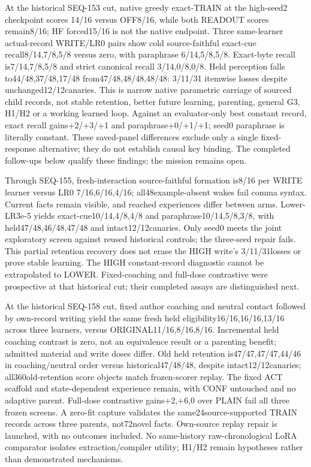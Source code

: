\documentclass{article}
\begin{document}
At the historical SEQ-153 cut, native greedy exact-TRAIN at the high-seed2 checkpoint scores
14/16 versus OFF8/16, while both READOUT scores remain8/16; HF forced15/16 is
not the native endpoint. Three same-learner actual-record WRITE/LR0 pairs show
cold source-faithful exact-cue recall8/14,7/8,5/8 versus zero, with paraphrase
6/14,5/8,5/8. Exact-byte recall is7/14,7/8,5/8 and strict canonical recall
3/14,0/8,0/8. Held perception falls to44/48,37/48,17/48 from47/48,48/48,48/48:
3/11/31 itemwise losses despite unchanged12/12canaries. This is narrow native
parametric carriage of sourced child records, not stable retention, better
future learning, parenting, general G3, H1/H2 or a working learned loop.
Against an evaluator-only best constant record, exact recall gains+2/+3/+1
and paraphrase+0/+1/+1; seed0 paraphrase is literally constant. These saved-panel
differences exclude only a single fixed-response alternative; they do not establish
causal key binding.
The completed follow-ups below qualify these findings; the mission remains open.

Through SEQ-155, fresh-interaction source-faithful formation is8/16 per WRITE
learner versus LR0 7/16,6/16,4/16; all48example-absent wakes fail comma syntax.
Current facts remain visible, and reached experiences differ between arms.
Lower-LR3e-5 yields exact-cue10/14,4/8,4/8 and paraphrase10/14,5/8,3/8,
with held47/48,46/48,47/48 and intact12/12canaries. Only seed0 meets the
joint exploratory screen against reused historical controls; the three-seed
repair fails. This partial retention recovery does not erase the HIGH write's
3/11/31losses or prove stable learning. The HIGH constant-record diagnostic
cannot be extrapolated to LOWER. Fixed-coaching and full-dose contrastive were
prospective at that historical cut; their completed assays are distinguished next.

At the historical SEQ-158 cut, fixed author coaching and neutral contact followed by own-record
writing yield the same fresh held eligibility16/16,16/16,13/16 across three
learners, versus ORIGINAL11/16,8/16,8/16. Incremental held coaching contrast is zero, not
an equivalence result or a parenting benefit; admitted material and write doses
differ. Old held retention is47/47,47/47,44/46 in coaching/neutral order versus
historical47/48/48, despite intact12/12canaries; all360old-retention score
objects match frozen-scorer replay. The fixed ACT scaffold and state-dependent
experience remain, with CONF untouched and no adaptive parent. Full-dose
contrastive gains+2,+6,0 over PLAIN fail all three frozen screens. A zero-fit
capture validates the same24source-supported TRAIN records across three parents,
not72novel facts. Own-source replay repair is launched, with no outcomes included.
No same-history raw-chronological LoRA comparator isolates extraction/compiler
utility; H1/H2 remain hypotheses rather than demonstrated mechanisms.
\end{document}
